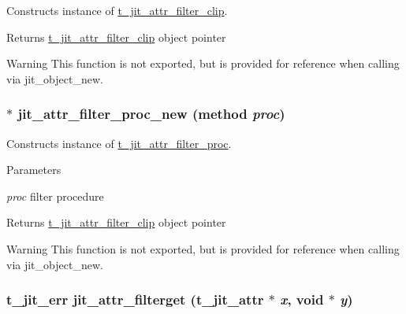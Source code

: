 Constructs instance of \hyperlink{structt__jit__attr__filter__clip}{t\_\-jit\_\-attr\_\-filter\_\-clip}. \begin{DoxyReturn}{Returns}
\hyperlink{structt__jit__attr__filter__clip}{t\_\-jit\_\-attr\_\-filter\_\-clip} object pointer
\end{DoxyReturn}
\begin{DoxyWarning}{Warning}
This function is not exported, but is provided for reference when calling via jit\_\-object\_\-new. 
\end{DoxyWarning}
\hypertarget{group__attrmod_gaa0ab21ae210657bc79f02ac61c023b85}{
\subsubsection[{jit\_\-attr\_\-filter\_\-proc\_\-new}]{ $\ast$ jit\_\-attr\_\-filter\_\-proc\_\-new ({\bf method} {\em proc})}}
\label{group__attrmod_gaa0ab21ae210657bc79f02ac61c023b85}


Constructs instance of \hyperlink{structt__jit__attr__filter__proc}{t\_\-jit\_\-attr\_\-filter\_\-proc}. 
\begin{DoxyParams}{Parameters}
\item[{\em proc}]filter procedure\end{DoxyParams}
\begin{DoxyReturn}{Returns}
\hyperlink{structt__jit__attr__filter__clip}{t\_\-jit\_\-attr\_\-filter\_\-clip} object pointer
\end{DoxyReturn}
\begin{DoxyWarning}{Warning}
This function is not exported, but is provided for reference when calling via jit\_\-object\_\-new. 
\end{DoxyWarning}
\hypertarget{group__attrmod_ga9a5cdc2a025611cacfe1dd41f87fd387}{
\subsubsection[{jit\_\-attr\_\-filterget}]{\setlength{\rightskip}{0pt plus 5cm}t\_\-jit\_\-err jit\_\-attr\_\-filterget ({\bf t\_\-jit\_\-attr} $\ast$ {\em x}, \/  void $\ast$ {\em y})}}
\label{group__attrmod_ga9a5cdc2a025611cacfe1dd41f87fd387}


